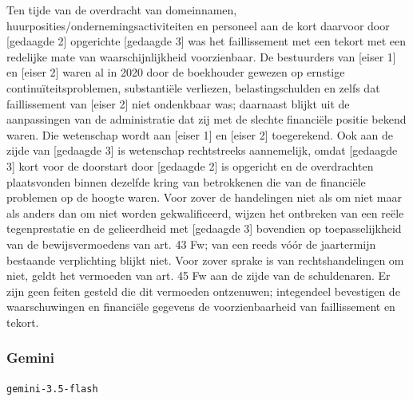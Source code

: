 \documentclass[
  dutch,
  a4paper,
]{article}
\begin{document}
Ten tijde van de overdracht van domeinnamen, huurposities/ondernemingsactiviteiten en personeel aan de kort daarvoor door {[}gedaagde 2{]} opgerichte {[}gedaagde 3{]} was het faillissement met een tekort met een redelijke mate van waarschijnlijkheid voorzienbaar. De bestuurders van {[}eiser 1{]} en {[}eiser 2{]} waren al in 2020 door de boekhouder gewezen op ernstige continuïteitsproblemen, substantiële verliezen, belastingschulden en zelfs dat faillissement van {[}eiser 2{]} niet ondenkbaar was; daarnaast blijkt uit de aanpassingen van de administratie dat zij met de slechte financiële positie bekend waren. Die wetenschap wordt aan {[}eiser 1{]} en {[}eiser 2{]} toegerekend. Ook aan de zijde van {[}gedaagde 3{]} is wetenschap rechtstreeks aannemelijk, omdat {[}gedaagde 3{]} kort voor de doorstart door {[}gedaagde 2{]} is opgericht en de overdrachten plaatsvonden binnen dezelfde kring van betrokkenen die van de financiële problemen op de hoogte waren. Voor zover de handelingen niet als om niet maar als anders dan om niet worden gekwalificeerd, wijzen het ontbreken van een reële tegenprestatie en de gelieerdheid met {[}gedaagde 3{]} bovendien op toepasselijkheid van de bewijsvermoedens van art. 43 Fw; van een reeds vóór de jaartermijn bestaande verplichting blijkt niet. Voor zover sprake is van rechtshandelingen om niet, geldt het vermoeden van art. 45 Fw aan de zijde van de schuldenaren. Er zijn geen feiten gesteld die dit vermoeden ontzenuwen; integendeel bevestigen de waarschuwingen en financiële gegevens de voorzienbaarheid van faillissement en tekort.

\newpage


\subsubsection{Gemini}\label{gemini-6}

\texttt{gemini-3.5-flash}
\end{document}
